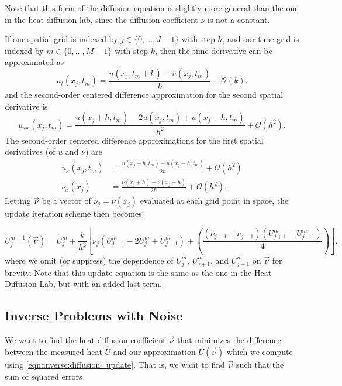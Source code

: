 Note that this form of the diffusion equation is slightly more general than the one in the heat diffusion lab, since the diffusion coefficient $\nu$ is not a constant.

If our spatial grid is indexed by $j\in\{0, \ldots, J-1\}$ with step $h$, and our time grid is indexed by $m\in\{0, \ldots, M-1\}$ with step $k$, then the time derivative can be approximated as
\begin{equation*}
	u_t(x_j, t_m) = \frac{u(x_j, t_m + k) - u(x_j, t_m)}{k} + \mathcal{O}(k).
\end{equation*}
and the second-order centered difference approximation for the second spatial derivative is
\begin{equation*}
	u_{xx}(x_j,t_m) = \frac{u(x_j + h,t_m )-2 u(x_j,t_m)+ u(x_j - h,t_m)}{h^2} + \mathcal{O}(h^2).
\end{equation*}
The second-order centered difference approximations for the first spatial derivatives (of $u$ and $\nu$) are
\begin{align*}
	u_x(x_j, t_m) &= \frac{u(x_j + h, t_m) - u(x_j - h, t_m)}{2h} + \mathcal{O}(h^2)\\
	\nu_x(x_j) &= \frac{\nu(x_j + h) - \nu(x_j - h)}{2h} + \mathcal{O}(h^2).
\end{align*}
Letting $\vec \nu$ be a vector of $\nu_j = \nu(x_j)$ evaluated at each grid point in space, the update iteration scheme then becomes

\begin{equation}
U_{j}^{m+1}(\vec \nu) = U_{j}^{m} + \frac{ k}{h^2} \left[ \nu_j(U_{j+1}^m - 2U_{j}^{m} + U_{j-1}^{m} ) + \left(\frac{(\nu_{j+1}-\nu_{j-1})(U^m_{j+1}-U^m_{j-1})}{4}\right)\right].
\label{eqn:inverse:diffusion_update}
\end{equation}
where we omit (or suppress) the dependence of $U_j^m$, $U_{j+1}^m$, and $U_{j-1}^m$ on $\vec \nu$ for brevity.
Note that this update equation is the same as the one in the Heat Diffusion Lab, but with an added last term.

\subsection*{Inverse Problems with Noise}

We want to find the heat diffusion coefficient $\vec \nu$ that minimizes the difference between the measured heat $\hat U$ and our approximation $U(\vec \nu)$ which we compute using \eqref{eqn:inverse:diffusion_update}. That is, we want to find $\vec \nu$ such that the sum of squared errors


